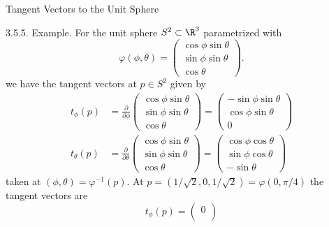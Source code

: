\documentclass[smaller,hyperref={CJKbookmarks=true}]{beamer}
\begin{document}
\begin{frame}{Tangent Vectors to the Unit Sphere}
\begin{spacing}{1}
\alert{3.5.5. Example.} For the unit sphere $S^2\subset\R^3$ parametrized with
\[\varphi(\phi,\theta)=\begin{pmatrix}
                         \cos\phi\sin\theta \\
                         \sin\phi\sin\theta \\
                         \cos\theta
                       \end{pmatrix}.\]
we have the tangent vectors at $p\in S^2$ given by
\begin{align*}
  t_\phi(p) &=\frac{\partial}{\partial\phi}\begin{pmatrix}
                         \cos\phi\sin\theta \\
                         \sin\phi\sin\theta \\
                         \cos\theta
                       \end{pmatrix}=\begin{pmatrix}
                                       -\sin\phi\sin\theta \\
                                       \cos\phi\sin\theta \\
                                       0
                                     \end{pmatrix} \\
  t_\theta(p) &=\frac{\partial}{\partial\theta}\begin{pmatrix}
                         \cos\phi\sin\theta \\
                         \sin\phi\sin\theta \\
                         \cos\theta
                       \end{pmatrix}=\begin{pmatrix}
                                       \cos\phi\cos\theta \\
                                       \sin\phi\cos\theta \\
                                       -\sin\theta
                                     \end{pmatrix}
\end{align*}
taken at $(\phi,\theta)=\varphi^{-1}(p)$.
\newpage
At $p=(1/\sqrt{2},0,1/\sqrt{2})=\varphi(0,\pi/4)$ the tangent vectors are
\[t_\phi(p)=\begin{pmatrix}
              0 \\

\end{pmatrix}\]
\end{spacing}
\end{frame}
\end{document}
